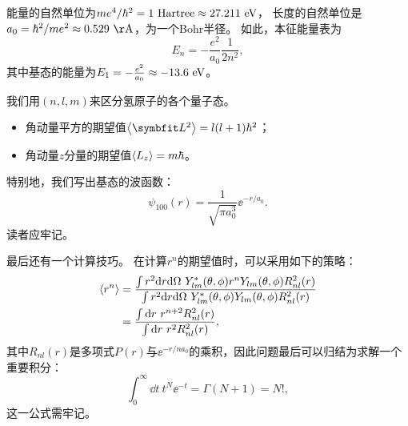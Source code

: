 能量的自然单位为$me^4/\hbar^2 = 1\ \rm{Hartree} \approx 27.211\ \rm{eV}$，
长度的自然单位是$a_0 = \hbar^2/me^2 \approx 0.529\ \rm{Å}$，为一个Bohr半径。
如此，本征能量表为
\begin{equation}
    E_n = -\frac{e^2}{a_0}\frac{1}{2n^2},
\end{equation}
其中基态的能量为$E_1 = -\frac{e^2}{a_0} \approx -13.6\ \rm{eV}$。

我们用$(n,l,m)$来区分氢原子的各个量子态。
\begin{itemize}
    \item 角动量平方的期望值$\expval{\LL^2}=l(l+1)\hbar^2$；
    \item 角动量$z$分量的期望值$\expval{L_z}=m\hbar$。
\end{itemize}

特别地，我们写出基态的波函数：
\begin{equation}
    \psi_{100}(r) = \frac{1}{\sqrt{\pi a_0^3}}\ee^{-r/a_0}.
\end{equation}
读者应牢记。

最后还有一个计算技巧。
在计算$r^n$的期望值时，可以采用如下的策略：
\begin{equation}
\begin{aligned}
    \expval{r^n}
    &= \frac{\int r^2 \dd r \dd\Omega \ Y_{lm}^*(\theta,\phi) r^n Y_{lm}(\theta,\phi) R_{nl}^2(r)}{\int r^2 \dd r \dd\Omega \ Y_{lm}^*(\theta,\phi) Y_{lm}(\theta,\phi) R_{nl}^2(r)} \\
    &= \frac{\int\dd r \ r^{n+2} R_{nl}^2(r)}{\int\dd r \ r^2 R_{nl}^2(r)},
\end{aligned}
\end{equation}
其中$R_{nl}(r)$是多项式$P(r)$与$\ee^{-r/na_0}$的乘积，因此问题最后可以归结为求解一个重要积分：
\begin{equation}
    \int_0^\infty \dd t \ t^{N} \ee^{-t} = \Gamma(N+1) = N!,
\end{equation}
这一公式需牢记。

